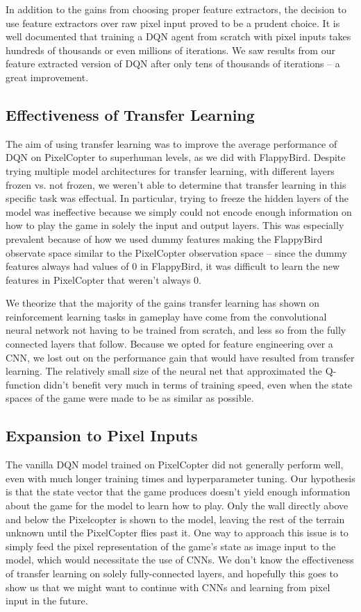 \documentclass{article}
\begin{document}
In addition to the gains from choosing proper feature extractors, the decision to use feature extractors over raw pixel input proved to be a prudent choice. 
It is well documented that training a DQN agent from scratch with pixel inputs takes hundreds of thousands or even millions of iterations.
We saw results from our feature extracted version of DQN after only tens of thousands of iterations -- a great improvement.


\subsection{Effectiveness of Transfer Learning}
The aim of using transfer learning was to improve the average performance of DQN on PixelCopter to superhuman levels, as we did with FlappyBird.
Despite trying multiple model architectures for transfer learning, with different layers frozen vs. not frozen, we weren't able to determine that transfer learning in this specific task was effectual.
In particular, trying to freeze the hidden layers of the model was ineffective because we simply could not encode enough information on how to play the game in solely the input and output layers.
This was especially prevalent because of how we used dummy features making the FlappyBird observate space similar to the PixelCopter observation space -- since the dummy features always had values of 0 in FlappyBird, it was difficult to learn the new features in PixelCopter that weren't always 0.

We theorize that the majority of the gains transfer learning has shown on reinforcement learning tasks in gameplay have come from the convolutional neural network not having to be trained from scratch, and less so from the fully connected layers that follow.
Because we opted for feature engineering over a CNN, we lost out on the performance gain that would have resulted from transfer learning.
The relatively small size of the neural net that approximated the Q-function didn't benefit very much in terms of training speed, even when the state spaces of the game were made to be as similar as possible.

\subsection{Expansion to Pixel Inputs}
The vanilla DQN model trained on PixelCopter did not generally perform well, even with much longer training times and hyperparameter tuning. Our hypothesis is that the state vector that the game produces doesn't yield enough information about the game for the model to learn how to play. Only the wall directly above and below the Pixelcopter is shown to the model, leaving the rest of the terrain unknown until the PixelCopter flies past it. One way to approach this issue is to simply feed the pixel representation of the game's state as image input to the model, which would necessitate the use of CNNs. We don't know the effectiveness of transfer learning on solely fully-connected layers, and hopefully this goes to show us that we might want to continue with CNNs and learning from pixel input in the future.
\end{document}

